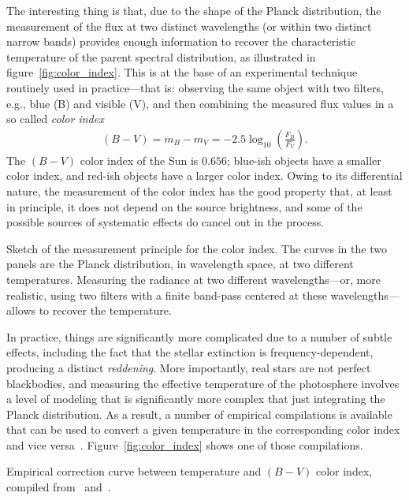 The interesting thing is that, due to the shape of the Planck distribution, the
measurement of the flux at two distinct wavelengths (or within two distinct narrow
bands) provides enough information to recover the characteristic temperature of
the parent spectral distribution, as illustrated in figure~\ref{fig:color_index}.
This is at the base of an experimental technique routinely used in practice---that is:
observing the same object with two filters, e.g., blue (B) and visible (V), and
then combining the measured flux values in a so called \emph{color index}
\begin{align}
  (B - V) = m_B - m_V = -2.5 \log_{10}\left( \frac{F_B}{F_V} \right).
\end{align}
The $(B - V)$ color index of the Sun is $0.656$; blue-ish objects have a smaller
color index, and red-ish objects have a larger color index.
Owing to its differential nature, the measurement of the color index has the good
property that, at least in principle, it does not depend on the source brightness,
and some of the possible sources of systematic effects do cancel out in the process.

\begin{marginfigure}
  
  \caption{Sketch of the measurement principle for the color index. The curves in
    the two panels are the Planck distribution, in wavelength space, at two
    different temperatures. Measuring the radiance at two different
    wavelengths---or, more realistic, using two filters with a finite band-pass
    centered at these wavelengths---allows to recover the temperature.}
  \label{fig:color_index}
\end{marginfigure}

In practice, things are significantly more complicated due to a number of subtle
effects, including the fact that the stellar extinction is frequency-dependent,
producing a distinct \emph{reddening}. More importantly, real stars are not
perfect blackbodies, and measuring the effective temperature of the photosphere
involves a level of modeling that is significantly more complex that just
integrating the Planck distribution. As a result, a number of empirical compilations
is available that can be used to convert a given temperature in the corresponding
color index and vice versa~\cite{1996ApJ...469..355F, 1998JRASC..92...36R, 2012EL.....9734008B}.
Figure~\ref{fig:color_index} shows one of those compilations.

\begin{marginfigure}
  
  \caption{Empirical correction curve between temperature and $(B - V)$ color
    index, compiled from~\cite{1996ApJ...469..355F} and~\cite{1998JRASC..92...36R}.}
  \label{fig:color_index}
\end{marginfigure}



